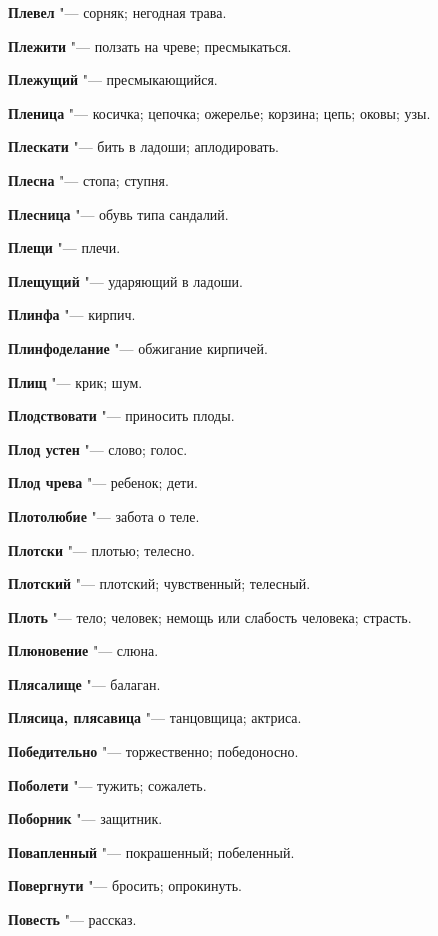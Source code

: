 \begin{mymulticols}
\noindent\textbf{Плевел} "--- сорняк; негодная трава. 

\noindent\textbf{Плежити} "--- ползать на чреве; пресмыкаться. 

\noindent\textbf{Плежущий} "--- пресмыкающийся. 

\noindent\textbf{Пленица} "--- косичка; цепочка; ожерелье; корзина; цепь; оковы; узы. 

\noindent\textbf{Плескати} "--- бить в ладоши; аплодировать. 

\noindent\textbf{Плесна} "--- стопа; ступня. 

\noindent\textbf{Плесница} "--- обувь типа сандалий. 

\noindent\textbf{Плещи} "--- плечи. 

\noindent\textbf{Плещущий} "--- ударяющий в ладоши. 

\noindent\textbf{Плинфа} "--- кирпич. 

\noindent\textbf{Плинфоделание} "--- обжигание кирпичей. 

\noindent\textbf{Плищ} "--- крик; шум. 

\noindent\textbf{Плодствовати} "--- приносить плоды. 

\noindent\textbf{Плод устен} "--- слово; голос. 

\noindent\textbf{Плод чрева} "--- ребенок; дети. 

\noindent\textbf{Плотолюбие} "--- забота о теле. 

\noindent\textbf{Плотски} "--- плотью; телесно. 

\noindent\textbf{Плотский} "--- плотский; чувственный; телесный. 

\noindent\textbf{Плоть} "--- тело; человек; немощь или слабость человека; страсть. 

\noindent\textbf{Плюновение} "--- слюна. 

\noindent\textbf{Плясалище} "--- балаган. 

\noindent\textbf{Плясица, плясавица} "--- танцовщица; актриса. 

\noindent\textbf{Победительно} "--- торжественно; победоносно. 

\noindent\textbf{Поболети} "--- тужить; сожалеть. 

\noindent\textbf{Поборник} "--- защитник. 

\noindent\textbf{Повапленный} "--- покрашенный; побеленный. 

\noindent\textbf{Повергнути} "--- бросить; опрокинуть. 

\noindent\textbf{Повесть} "--- рассказ. 


\end{mymulticols}
